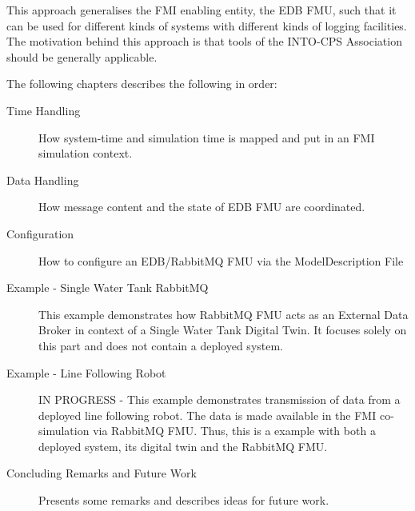 This approach generalises the FMI enabling entity, the EDB FMU, such that
it can be used for different kinds of systems with different kinds of logging
facilities. The motivation behind this approach is that tools of the INTO-CPS Association
should be generally applicable.

The following chapters describes the following in order:
\begin{description}
  \item[Time Handling] How system-time and simulation time is mapped and put in
    an FMI simulation context.
  \item[Data Handling] How message content and the state of EDB FMU are
    coordinated.
  \item[Configuration] How to configure an EDB/RabbitMQ FMU via the ModelDescription File
  \item[Example - Single Water Tank RabbitMQ] This example demonstrates how RabbitMQ FMU
    acts as an External Data Broker in context of a Single Water Tank Digital Twin. It focuses solely on this part and does not
    contain a deployed system.

    \item[Example - Line Following Robot] IN PROGRESS - This example demonstrates transmission
    of data from a deployed line following robot. The data is made available in
    the FMI co-simulation via RabbitMQ FMU. Thus, this is a example with
    both a deployed system, its digital twin and the RabbitMQ FMU.
  \item[Concluding Remarks and Future Work] Presents some remarks and describes ideas for future work.
\end{description}


